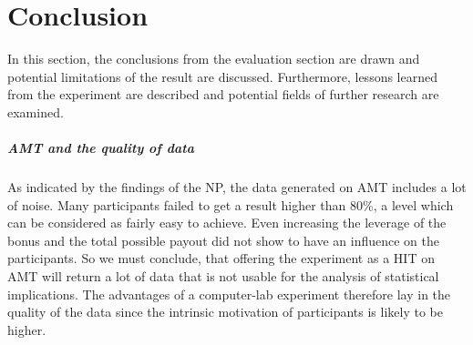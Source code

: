 
\chapter{Conclusion}
\label{ch:Conclusion}

In this section, the conclusions from the evaluation section are drawn and potential limitations of the result are discussed. Furthermore, lessons learned from the experiment are described and potential fields of further research are examined.

\paragraph{\acf{AMT} and the quality of data}
As indicated by the findings of the \acl{NP}, the data generated on \ac{AMT} includes a lot of noise. Many participants failed to get a result higher than 80\%, a level which can be considered as fairly easy to achieve. Even increasing the leverage of the bonus and the total possible payout did not show to have an influence on the participants. So we must conclude, that offering the experiment as a \ac{HIT} on \ac{AMT} will return a lot of data that is not usable for the analysis of statistical implications. The advantages of a computer-lab experiment therefore lay in the quality of the data since the intrinsic motivation of participants is likely to be higher.

